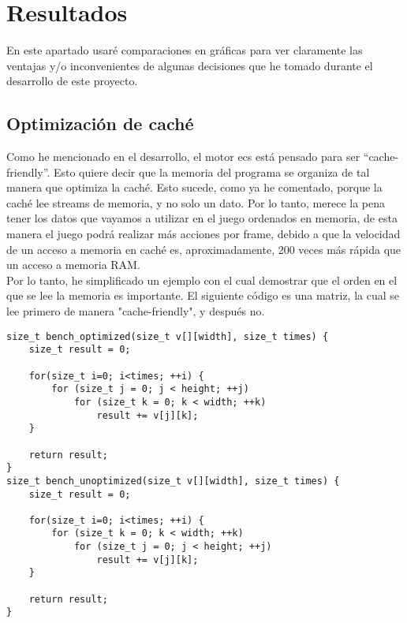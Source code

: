 \chapter{Resultados}
\label{resultados}
En este apartado usaré comparaciones en gráficas para ver claramente las ventajas y/o inconvenientes de algunas decisiones que he tomado durante el desarrollo de este proyecto.

\section{Optimización de caché}
Como he mencionado en el desarrollo, el motor \gls{ecs} está pensado para ser ``cache-friendly''. Esto quiere decir que la memoria del programa se organiza de tal manera que optimiza la caché. Esto sucede, como ya he comentado, porque la caché lee streams de memoria, y no solo un dato. Por lo tanto, merece la pena tener los datos que vayamos a utilizar en el juego ordenados en memoria, de esta manera el juego podrá realizar más acciones por frame, debido a que la velocidad de un acceso a memoria en caché es, aproximadamente, 200 veces más rápida que un acceso a memoria RAM.
\\
Por lo tanto, he simplificado un ejemplo con el cual demostrar que el orden en el que se lee la memoria es importante. El siguiente código es una matriz, la cual se lee primero de manera "cache-friendly", y después no.
\begin{lstlisting}[style=C-color, caption={Caché optimizada vs sin optimizar.},label=cache-optimization]
size_t bench_optimized(size_t v[][width], size_t times) {
	size_t result = 0;
	
	for(size_t i=0; i<times; ++i) {
		for (size_t j = 0; j < height; ++j) 
			for (size_t k = 0; k < width; ++k)
				result += v[j][k];
	}
	
	return result;
}
size_t bench_unoptimized(size_t v[][width], size_t times) {
	size_t result = 0;
	
	for(size_t i=0; i<times; ++i) {
		for (size_t k = 0; k < width; ++k) 
			for (size_t j = 0; j < height; ++j) 
				result += v[j][k];
	}
	
	return result;
}
\end{lstlisting}

